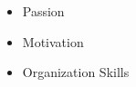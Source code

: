 %
%
%

\twocolumnsection
{
\begin{skills}
\end{skills}}
{
\vspace{1em}
\begin{itemize}
	\item Passion
	\item Motivation                    
    \item Organization Skills
\end{itemize}
}

